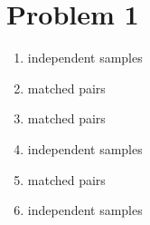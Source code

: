 \documentclass{article}
\title{\thetitle}
\author{\theauthor}
\begin{document}
\maketitle
\section*{Problem 1}
\begin{enumerate}
\item independent samples \\
\item matched pairs \\
\item matched pairs \\
\item independent samples \\
\item matched pairs \\
\item independent samples
\end{enumerate}
\end{document}
